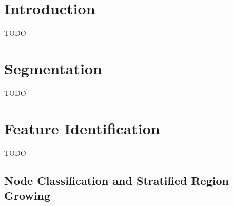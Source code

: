 \documentclass[preprint,a4paper]{elsarticle}
\begin{document}
\section{Introduction}

\iffalse
The decisions that cancer medics are required to take regarding how best to treat their patients can have a profound effect on patient outcomes, but they are inherently decisions that must be taken based on limited information (e.g.~that obtained from imaging). As such, it is critical that medics can derive maximum benefit from the information they do have, and much research has been devoted to the development of computerised systems that can help them in this regard. Certain features are particularly helpful in such systems, including an ability to render a 3D model of a patient's internal organs (which is much easier for medics to visualise than a series of 2D slices) and an ability to calculate the volumes of such organs (which can have diagnostic implications). However, both visualisation and volume calculation rely on first segmenting the available images and identifying the organs within them (the problems known, respectively, as \emph{segmentation} and \emph{feature identification}).

Both segmentation and feature identification have received a great deal of attention in recent years, and impressive automated results have been obtained in many cases; however, general automatic feature identification remains a major research challenge.

In this paper, we present \emph{millipede}, the system that encapsulates our approach as just described.
\fi

TODO

\nocite{gvcfbit07,gvchsi09}

\section{Segmentation}

TODO

\section{Feature Identification}

TODO

\subsection{Node Classification and Stratified Region Growing}
\end{document}
